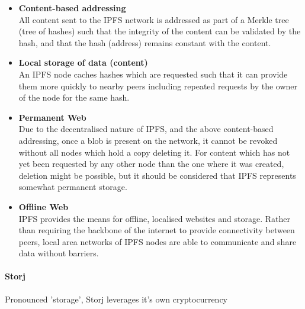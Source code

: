 \begin{itemize}
	\item 
    	\textbf{Content-based addressing} \\
        All content sent to the IPFS network is addressed as part of a Merkle tree (tree of hashes) such that the integrity of the content can be validated by the hash, and that the hash (address) remains constant with the content.
    \item 
    	\textbf{Local storage of data (content)} \\
        An IPFS node caches hashes which are requested such that it can provide them more quickly to nearby peers including repeated requests by the owner of the node for the same hash.
    \item 
    	\textbf{Permanent Web} \\
        Due to the decentralised nature of IPFS, and the above content-based addressing, once a blob is present on the network, it cannot be revoked without all nodes which hold a copy deleting it. For content which has not yet been requested by any other node than the one where it was created, deletion might be possible, but it should be considered that IPFS represents somewhat permanent storage.
    \item
    	\textbf{Offline Web} \\
        IPFS provides the means for offline, localised websites and storage. Rather than requiring the backbone of the internet to provide connectivity between peers, local area networks of IPFS nodes are able to communicate and share data without barriers.
\end{itemize}

\paragraph{Storj}

Pronounced 'storage', Storj leverages it's own  cryptocurrency
